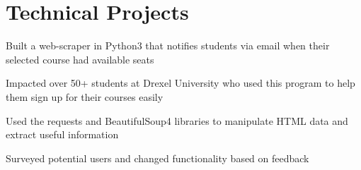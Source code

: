 \documentclass[]{deedy-resume-openfont}
\begin{document}
\begin{minipage}[t]{0.66\textwidth}



\section{Technical Projects}
\begin{tightemize}
\item Built a web-scraper in Python3 that notifies students via email when their selected course had available seats
\item Impacted over 50+ students at Drexel University who used this program to help them sign up for their courses easily
\item Used the requests and BeautifulSoup4 libraries to manipulate HTML data and extract useful information
\item Surveyed potential users and changed functionality based on feedback
\end{tightemize}
\sectionsep


\end{minipage}
\end{document}
